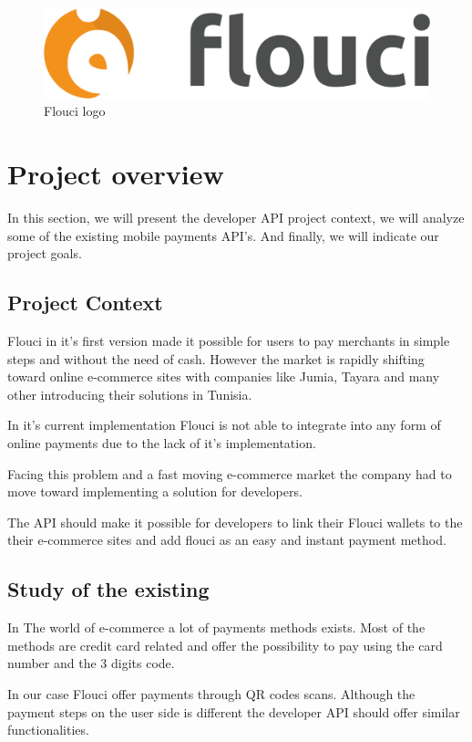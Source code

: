 \begin{spacing}{1.2}
\begin{figure}[!ht]\centering
\includegraphics[scale=0.3]{floucilogo.png}
\caption{Flouci logo}
\label{fig:fig1}
\end{figure}

\section{Project overview}
In this section, we will present the developer API project context, we will analyze some of the existing mobile payments API's. And finally, we will indicate our project goals.
\subsection{Project Context}
Flouci in it's first version made it possible for users to pay merchants in simple steps and without the need of cash. However the market is rapidly shifting toward online e-commerce sites with companies like Jumia, Tayara and many other introducing their solutions in Tunisia.

In it's current implementation Flouci is not able to integrate into any form of online payments due to the lack of it's implementation.

Facing this problem and a fast moving e-commerce market the company had to move toward implementing a solution for developers.

The API should make it possible for developers to link their Flouci wallets to the their e-commerce sites and add flouci as an easy and instant payment method.
\subsection{Study of the existing}
In The world of e-commerce a lot of payments methods exists. Most of the methods are credit card related and offer the possibility to pay using the card number and the 3 digits code. 

In our case Flouci offer payments through QR codes scans. Although the payment steps on the user side is different the developer API should offer similar functionalities.



\end{spacing}
